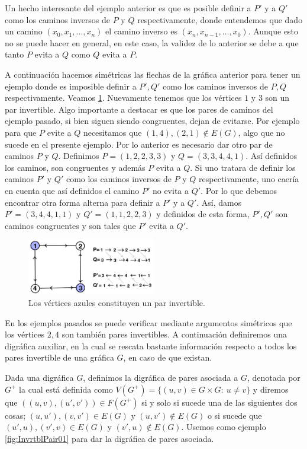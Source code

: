 Un hecho interesante del ejemplo anterior es que es posible definir a $P'$ y a $Q'$ como los caminos inversos de $P$ y $Q$ respectivamente, donde entendemos que dado un camino $(x_0,x_1, \dots, x_n)$ el camino inverso es $(x_n,x_{n-1}, \dots, x_0)$. Aunque esto no se puede hacer en general, en este caso, la validez de lo anterior se debe a que tanto $P$ evita a $Q$ como $Q$ evita a $P$. 

A continuación hacemos simétricas las flechas de la gráfica anterior para tener un ejemplo donde es imposible definir a $P', Q'$ como los caminos inversos de $P, Q$ respectivamente. Veamos \cref{fig:InvrtblPair02}. Nuevamente tenemos que los vértices $1$ y $3$ son un par invertible. Algo importante a destacar es que los pares de caminos del ejemplo pasado, si bien siguen siendo congruentes, dejan de evitarse. Por ejemplo para que $P$ evite a $Q$ necesitamos que $(1,4),(2,1)\notin E(G)$, algo que no sucede en el presente ejemplo. Por lo anterior es necesario dar otro par de caminos $P$ y $Q$. Definimos $P=(1,2,2,3,3)$ y $Q=(3,3,4,4,1)$. Así definidos los caminos, son congruentes y además $P$ evita a $Q$. Si uno tratara de definir los caminos $P'$ y $Q'$ como los caminos inversos de $P$ y $Q$ respectivamente, uno caería en cuenta que así definidos el camino $P'$ no evita a $Q'$. Por lo que debemos encontrar otra forma alterna para definir a $P'$ y a $Q'$. Así, damos $P'=(3,4,4,1,1)$ y $Q'=(1,1,2,2,3)$ y definidos de esta forma, $P', Q'$ son caminos congruentes y son tales que $P'$ evita a $Q'$.

\begin{figure}[H]
  \centering
  \includegraphics[width=0.5\textwidth]{recursos/capturas/InvrtblPair02.jpg}
  \caption{Los vértices azules constituyen un par invertible.}
  \label{fig:InvrtblPair02}
\end{figure}

En los ejemplos pasados se puede verificar mediante argumentos simétricos que los vértices $2,4$ son también pares invertibles. A continuación definiremos una digráfica auxiliar, en la cual se rescata bastante información respecto a todos los pares invertible de una gráfica $G$, en caso de que existan.

Dada una digráfica $G$, definimos la digráfica de pares asociada a $G$, denotada por $G^{+}$ la cual está definida como $V(G^{+})=\{ (u,v)\in G\times G \colon\ u\neq v \}$ y diremos que $((u,v),(u',v'))\in F(G^{+})$ si y solo si sucede una de las siguientes dos cosas; $(u,u'),(v,v')\in E(G)$ y $(u,v')\notin E(G)$ o si sucede que $(u',u),(v',v)\in E(G)$ y $(v',u)\notin E(G)$. Usemos como ejemplo \cref{fig:InvrtblPair01} para dar la digráfica de pares asociada.

